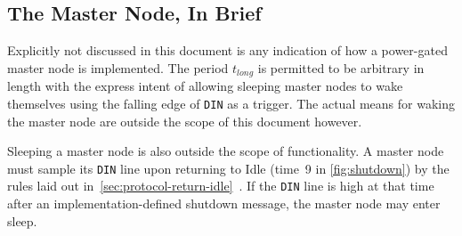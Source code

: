 \subsection{The Master Node, In Brief}
Explicitly not discussed in this document is any indication of how a
power-gated master node is implemented. The period $t_{long}$ is permitted to
be arbitrary in length with the express intent of allowing sleeping master
nodes to wake themselves using the falling edge of {\tt DIN} as a trigger. The
actual means for waking the master node are outside the scope of this
document however.

Sleeping a master node is also outside the scope of \bus functionality.
A master node must sample its {\tt DIN} line upon returning to Idle (time~9
in \autoref{fig:shutdown}) by the rules laid out
in~\ref{sec:protocol-return-idle}~. If the
{\tt DIN} line is high at that time after an implementation-defined shutdown
message, the master node may enter sleep.
